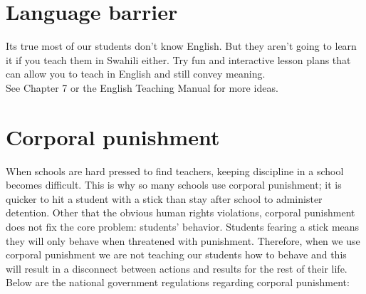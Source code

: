 \section{Language barrier}

Its true most of our students don't know English.  But they aren't going to learn it if you teach them in Swahili either.  Try fun and interactive lesson plans that can allow you to teach in English and still convey meaning.\\

See Chapter 7 or the English Teaching Manual for more ideas.

\section{Corporal punishment}
When schools are  hard pressed to find teachers, keeping discipline in a school becomes difficult.  This is why so many schools use corporal punishment; it is quicker to hit a student with a stick than stay after school to administer detention.  Other that the obvious human rights violations, corporal punishment does not fix the core problem: students' behavior. Students fearing a stick means they will only behave when threatened with punishment.  Therefore, when we use corporal punishment we are not teaching our students how to behave and this will result in a disconnect between actions and results for the rest of their life.  Below are the national government regulations regarding corporal punishment:
